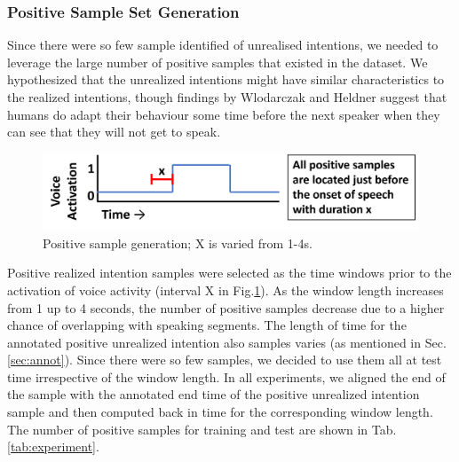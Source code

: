 \documentclass[manuscript,screen,review]{acmart}
\begin{document}
\subsubsection{Positive Sample Set Generation}
Since there were so few sample identified of unrealised intentions, we needed to leverage the large number of positive samples that existed in the dataset. We hypothesized that the unrealized intentions might have similar characteristics to the realized intentions, though findings by Wlodarczak and Heldner suggest that humans do adapt their behaviour some time before the next speaker when they can see that they will not get to speak\cite{wlodarczak2020breathing}. 

\begin{figure}[tb]
  \includegraphics[width=0.6\columnwidth]{samples/vad10.png}
  \vspace{-4mm}
  \caption{Positive sample generation; X is varied from 1-4s.}
    \vspace{-2mm}
  \label{fig:vad}
\end{figure}
Positive realized intention samples were selected as the time windows prior to the activation of voice activity (interval X in Fig.\ref{fig:vad}). As the window length increases from 1 up to 4 seconds, the number of positive samples decrease due to a higher chance of overlapping with speaking segments. The length of time for the annotated positive unrealized intention also samples varies (as mentioned in Sec. \ref{sec:annot}). Since there were so few samples, we decided to use them all at test time irrespective of the window length. In all experiments, we aligned the end of the sample with the annotated end time of the positive unrealized intention sample and then computed back in time for the corresponding window length. The number of positive samples for training and test are shown in Tab. \ref{tab:experiment}.
\end{document}
